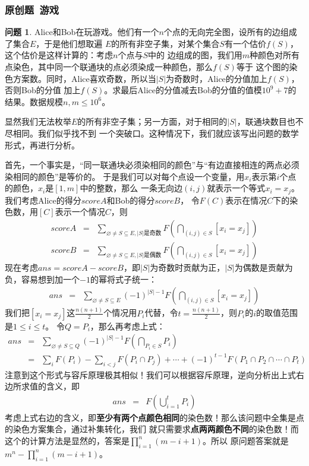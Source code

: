 \documentclass{noithesis}
\theoremstyle{plain}      \newtheorem{theorem}{定理}[subsection]
\theoremstyle{definition} \newtheorem{problem}{问题}[subsection]
\renewcommand{\emptyset}{\varnothing}
\begin{document}
\subsubsection{原创题~游戏}

\begin{problem}
Alice和Bob在玩游戏。他们有一个$n$个点的无向完全图，设所有的边组成了集合$E$，于是他们想取遍
$E$的所有非空子集，对某个集合$S$有一个估价$f(S)$，这个估价是这样计算的：考虑$n$个点与$S$中的
边组成的图，我们用$m$种颜色对所有点染色，其中同一个联通块的点必须染成一种颜色，那么$f(S)$等于
这个图的染色方案数。同时，Alice喜欢奇数，所以当$|S|$为奇数时，Alice的分值加上$f(S)$，否则Bob的分值
加上$f(S)$。求最后Alice的分值减去Bob的分值的值模$10^9+7$的结果。数据规模$n,m \le 10^6$。
\end{problem}

显然我们无法枚举$E$的所有非空子集；另一方面，对于相同的$|S|$，联通块数目也不尽相同。我们似乎找不到
一个突破口。这种情况下，我们就应该写出问题的数学形式，再进行分析。 \par

首先，一个事实是，“同一联通块必须染相同的颜色”与“有边直接相连的两点必须染相同的颜色”是等价的。
于是我们可以对每个点设一个变量，用$x_i$表示第$i$个点的颜色，$x_i$是$[1,m]$中的整数，那么
一条无向边$(i,j)$就表示一个等式$x_i = x_j$。我们考虑Alice的得分$scoreA$和Bob的得分$scoreB$，
令$F(C)$表示在情况$C$下的染色数，用$[C]$表示一个情况$C$，则
\begin{eqnarray*}
scoreA & = & \sum_{\emptyset \neq S \subseteq E,|S|\mbox{是奇数}} F\left( \bigcap_{(i, j) \in S} [x_i = x_j] \right) \\
scoreB & = & \sum_{\emptyset \neq S \subseteq E,|S|\mbox{是偶数}} F\left( \bigcap_{(i, j) \in S} [x_i = x_j] \right)
\end{eqnarray*}
现在考虑$ans = scoreA - scoreB$，即$|S|$为奇数时贡献为正，$|S|$为偶数是贡献为负，容易想到加一个$-1$的幂将式子统一：
\begin{eqnarray*}
ans & = & \sum_{\emptyset \neq S \subseteq E} (-1)^{|S|-1} F\left( \bigcap_{(i, j) \in S} [x_i = x_j] \right)
\end{eqnarray*}
我们把$[x_i = x_j]$这$\frac{n(n+1)}{2}$个情况用$P_i$代替，令$t = \frac{n(n+1)}{2}$，则$P_i$的$i$的取值范围是$1 \le i \le t$。
令$Q = {P_i}$，那么再考虑上式：
\begin{eqnarray*}
ans & = & \sum_{\emptyset \neq S \subseteq Q} (-1)^{|S|-1} F\left( \bigcap_{P_i \in S} P_i \right) \\
    & = & \sum_{i}F(P_i) - \sum_{i < j}F(P_i \cap P_j) + \cdots + (-1)^{t - 1} F(P_1 \cap P_2 \cap \cdots \cap P_t)
\end{eqnarray*}
注意到这个形式与容斥原理极其相似！我们可以根据容斥原理，逆向分析出上式右边所求值的含义，即
\begin{eqnarray*}
ans & = & F\left( \bigcup_{i = 1}^t{P_i} \right)
\end{eqnarray*}
考虑上式右边的含义，即\textbf{至少有两个点颜色相同}的染色数！那么该问题中全集是点的染色方案集合，通过补集转化，我们
就只需要求\textbf{点两两颜色不同}的染色数！而这个的计算方法是显然的，答案是$\prod_{i = 1}^n{(m - i + 1)}$。所以
原问题答案就是$m^n - \prod_{i=1}^n(m-i+1)$。 \par
\end{document}
